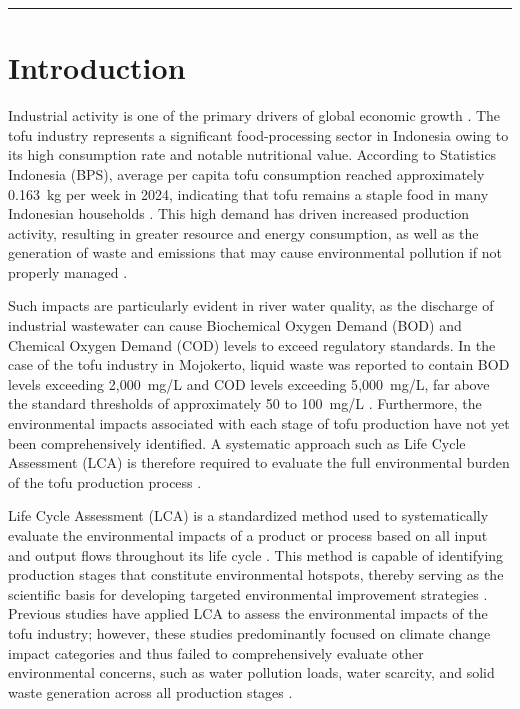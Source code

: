 \documentclass[12pt,a4paper]{article}
\begin{document}
\noindent\textcolor{ruleblue}{\rule{\linewidth}{1.2pt}}
\vspace{0.4em}

\section{Introduction}

Industrial activity is one of the primary drivers of global economic growth \citep{Ghisellini2016}.
The tofu industry represents a significant food-processing sector in Indonesia owing to its high
consumption rate and notable nutritional value. According to Statistics Indonesia (BPS), average per
capita tofu consumption reached approximately 0.163~kg per week in 2024, indicating that tofu remains
a staple food in many Indonesian households \citep{Dewi2024}. This high demand has driven increased
production activity, resulting in greater resource and energy consumption, as well as the generation of
waste and emissions that may cause environmental pollution if not properly managed \citep{Rosyidah2020}.

Such impacts are particularly evident in river water quality, as the discharge of industrial wastewater
can cause Biochemical Oxygen Demand (BOD) and Chemical Oxygen Demand (COD) levels to exceed regulatory
standards. In the case of the tofu industry in Mojokerto, liquid waste was reported to contain BOD
levels exceeding 2{,}000~mg/L and COD levels exceeding 5{,}000~mg/L, far above the standard thresholds
of approximately 50 to 100~mg/L \citep{Sjafruddin2022}. Furthermore, the environmental impacts
associated with each stage of tofu production have not yet been comprehensively identified. A systematic
approach such as Life Cycle Assessment (LCA) is therefore required to evaluate the full environmental
burden of the tofu production process \citep{Islami2025}.

Life Cycle Assessment (LCA) is a standardized method used to systematically evaluate the environmental
impacts of a product or process based on all input and output flows throughout its life cycle
\citep{Hauschild2017}. This method is capable of identifying production stages that constitute
environmental hotspots, thereby serving as the scientific basis for developing targeted environmental
improvement strategies \citep{Chitaka2023}. Previous studies have applied LCA to assess the
environmental impacts of the tofu industry; however, these studies predominantly focused on climate
change impact categories and thus failed to comprehensively evaluate other environmental concerns, such
as water pollution loads, water scarcity, and solid waste generation across all production stages
\citep{Nugroho2024, Wardana2024}.
\end{document}
